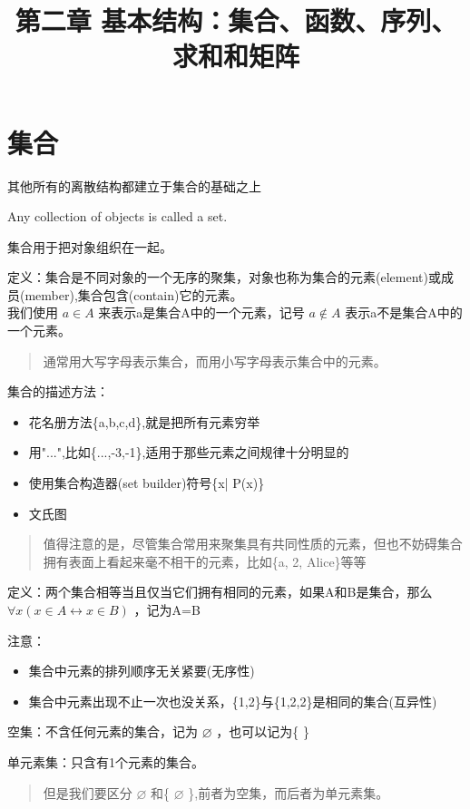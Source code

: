 \documentclass[12pt,a4paper,oneside]{ctexart}
\title{第二章 基本结构：集合、函数、序列、求和和矩阵}
\begin{document}
\section*{集合}

其他所有的离散结构都建立于集合的基础之上

Any collection of objects is called a set.

集合用于把对象组织在一起。

定义：集合是不同对象的一个无序的聚集，对象也称为集合的元素(element)或成员(member),集合包含(contain)它的元素。\\
我们使用 \(a\in A\) 来表示a是集合A中的一个元素，记号 \(a\notin A\) 表示a不是集合A中的一个元素。

\begin{quote}
通常用大写字母表示集合，而用小写字母表示集合中的元素。
\end{quote}

集合的描述方法：

\begin{itemize}
\item
  花名册方法\{a,b,c,d\},就是把所有元素穷举
\item
  用"...",比如\{...,-3,-1\},适用于那些元素之间规律十分明显的
\item
  使用集合构造器(set builder)符号\{x| P(x)\}
\item
  文氏图
\end{itemize}

\begin{quote}
值得注意的是，尽管集合常用来聚集具有共同性质的元素，但也不妨碍集合拥有表面上看起来毫不相干的元素，比如\{a, 2, Alice\}等等
\end{quote}

定义：两个集合相等当且仅当它们拥有相同的元素，如果A和B是集合，那么 \(\forall x(x\in A\leftrightarrow x\in B)\) ，记为A=B

注意：

\begin{itemize}
\item
  集合中元素的排列顺序无关紧要(无序性)
\item
  集合中元素出现不止一次也没关系，\{1,2\}与\{1,2,2\}是相同的集合(互异性)
\end{itemize}

空集：不含任何元素的集合，记为 \(\varnothing\) ，也可以记为\{ \}

单元素集：只含有1个元素的集合。

\begin{quote}
但是我们要区分 \(\varnothing\) 和\{ \(\varnothing\) \},前者为空集，而后者为单元素集。
\end{quote}
\end{document}
